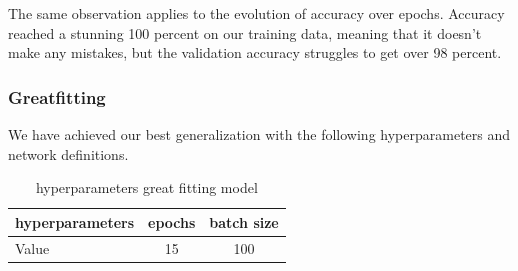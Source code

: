 \documentclass[a4paper, twocolumn, twoside]{article}
\begin{document}
	The same observation applies to the evolution of accuracy over epochs.
	Accuracy reached a stunning 100 percent on our training data, meaning that it doesn't make any mistakes, but the validation accuracy struggles to get over 98 percent.\\

        \subsubsection{Greatfitting}
	We have achieved our best generalization with the following hyperparameters and network definitions.
	\begin{table}[H]
	\centering
	\begin{tabular}{|l|c|c|}
	\hline
	hyperparameters & epochs & batch size  \\
	\hline
	Value & 15 & 100   \\
	\hline
	\end{tabular}
	\caption{hyperparameters great fitting model}
	\end{table}
\end{document}
